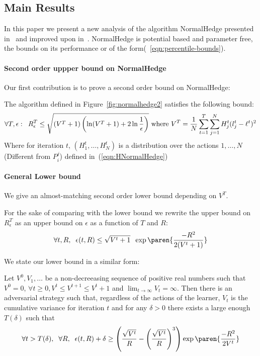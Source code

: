 \documentclass{article}[12pt]
\begin{document}
\subsection{Main Results}
In this paper we present a new analysis of the algorithm NormalHedge
presented in~\cite{sec:NormalHedgeAlg} and improved upon
in~\cite{luo2015achieving}.  NormalHedge is potential based and
parameter free, the bounds on its performance or of the
form(~\ref{eqn:percentile-bounds}).

\paragraph*{Second order uppper bound on NormalHedge}
Our first contribution is to prove a second order bound on NormalHedge:
\begin{theorem} \label{thm:NHUpperBound}
The algorithm defined in Figure~\ref{fig:normalhedge2} satisfies the following bound:
\begin{equation} \label{eqn:upper-bound}
\forall T,\epsilon:\;\; R^T_{\epsilon}\leq \sqrt{(V^T+1) \left( \ln (V^T+1) + 2 \ln \frac{1}{\epsilon}\right)}
\mbox{  where  } V^T=\frac{1}{N} \sum_{t=1}^T \sum_{j=1}^N H^t_j (l_j^t-\ell^t)^2
\end{equation}
Where for iteration $t$, $(H_1^t,\ldots, H_N^t)$ is a distribution
over the actions $1,\ldots,N$ (Different from $P_i^j$) defined
in~(\ref{eqn:HNormalHedge})
\end{theorem}

\paragraph*{General Lower bound}
We give an almost-matching second order lower bound depending on $V^T$.

For the sake of comparing with the lower bound we rewrite the upper bound on $R^T_\epsilon$ as an upper
bound on $\epsilon$ as a function of $T$ and $R$:
\begin{equation} \label{eqn:epsilonUpperBound}
  \forall t,R,\;\; \epsilon(t,R) \leq \sqrt{V^t+1} \;\; \exp \paren{\frac{-R^2}{2(V^t+1)}}
\end{equation}

We state our lower bound in a similar form:
\begin{theorem} \label{thm:LowerBound} Let $V^0,V_1,\ldots$ be a
  non-decreeasing sequence of positive real numbers such that $V^0=0$,
  $\forall t \geq 0, V^t\leq V^{t+1} \leq V^t+1$ and
  $\lim_{t \to \infty} V_t = \infty$.  Then there is an adversarial
  strategy such that, regardless of the actions of the learner, $V_t$
  is the cumulative variance for iteration $t$ and for any $\delta>0$
  there exists a large enough $T(\delta)$ such that
  \begin{equation} \label{eqn:epsilonLowerBound}
    \forall t > T(\delta),\;\;\forall R,\;\; \epsilon(t,R) +\delta \geq
    \left(\frac{\sqrt{V^t}}{\R} -  \left( \frac{\sqrt{V^t}}{\R} \right)^3 \right) \exp \paren{\frac{-R^2}{2V^t}}
  \end{equation}
\end{theorem}
\end{document}
